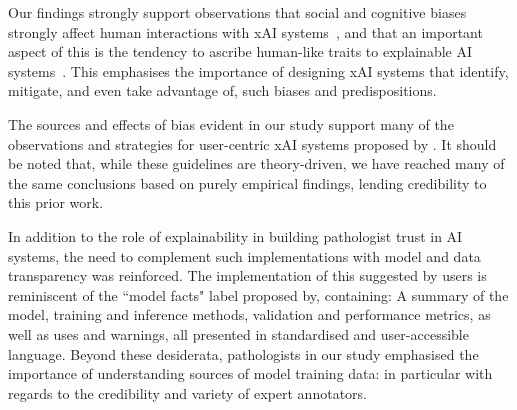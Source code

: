 
Our findings strongly support observations that social and cognitive biases strongly affect human interactions with xAI systems~\cite{miller2019explanation, jussupow2021augmenting}, and that an important aspect of this is the tendency to ascribe human-like traits to explainable AI systems~\citet{de2017people, miller2019explanation}. This emphasises the importance of designing xAI systems that identify, mitigate, and even take advantage of, such biases and predispositions.

The sources and effects of bias evident in our study support many of the observations and strategies for user-centric xAI systems proposed by \citet{wang_designing_2019}. It should be noted that, while these guidelines are theory-driven, we have reached many of the same conclusions based on purely empirical findings, lending credibility to this prior work.


In addition to the role of explainability in building pathologist trust in AI systems, the need to complement such implementations with model and data transparency was reinforced. The implementation of this suggested by users is reminiscent of the ``model facts" label proposed by\cite{sendak2020presenting}, containing: A summary of the model, training and inference methods, validation and performance metrics, as well as uses and warnings, all presented in standardised and user-accessible language. Beyond these desiderata, pathologists in our study emphasised the importance of understanding sources of model training data: in particular with regards to the credibility and variety of expert annotators.

